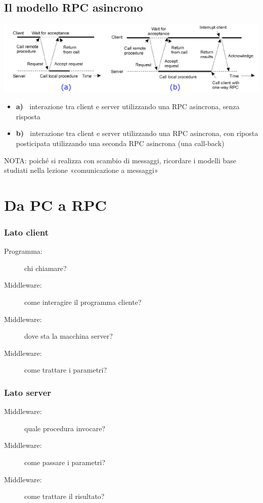 \subsection{Il modello RPC asincrono}
\begin{center}
    \includegraphics[scale=0.5]{img/RPC_modello2.jpg}
\end{center}
\begin{itemize}
    \item[] \textbf{a) \,} interazione tra client e server utilizzando una RPC asincrona, senza risposta
    \item[] \textbf{b) \,} interazione tra client e server utilizzando una RPC asincrona, con riposta posticipata utilizzando una seconda RPC asincrona (una call-back)
\end{itemize}
NOTA: poiché si realizza con scambio di messaggi, ricordare i modelli base studiati nella lezione «comunicazione a messaggi»

\section{Da PC a RPC}
\subsubsection{Lato client}
\begin{description}
    \item[Programma:] chi chiamare?
    \item[Middleware:] come interagire il programma cliente?
    \item[Middleware:] dove sta la macchina server?
    \item[Middleware:] come trattare i parametri?
\end{description}
\subsubsection{Lato server}
\begin{description}
    \item[Middleware:] quale procedura invocare?
    \item[Middleware:] come passare i parametri?
    \item[Middleware:] come trattare il risultato?
\end{description}

